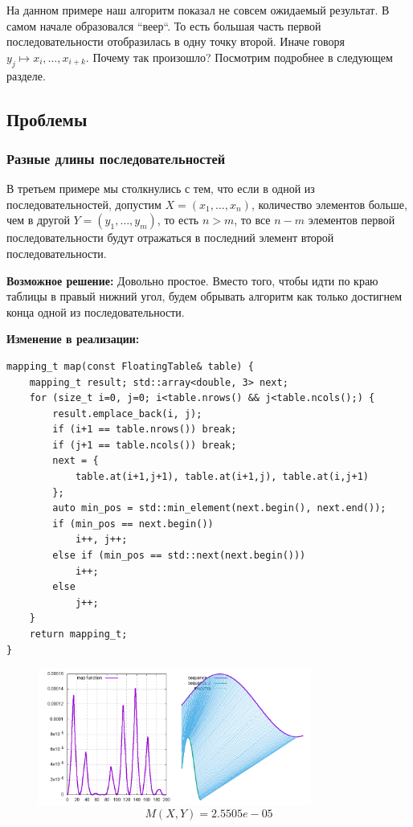 \documentclass[12pt]{article}
\begin{document}
\begin{enumerate}
    На данном примере наш алгоритм показал не совсем ожидаемый результат.
    В самом начале образовался ``веер``.
    То есть большая часть первой последовательности отобразилась в одну
    точку второй. Иначе говоря $y_j \mapsto {x_i,\ldots,x_{i+k}}$. Почему так произошло?
    Посмотрим подробнее в следующем разделе.

\end{enumerate}

\newpage
\subsection{Проблемы}

\subsubsection{Разные длины последовательностей}
     В третьем примере мы столкнулись с тем, что если в одной из последовательностей,
     допустим $X = (x_1, \ldots, x_n)$, количество элементов больше, чем в другой $Y = (y_1, \ldots,y_m)$,
     то есть $n > m$, то все $n - m$ элементов первой последовательности будут отражаться в последний
     элемент второй последовательности.

     \textbf{Возможное решение:} Довольно простое. Вместо того, чтобы идти по краю таблицы в правый
     нижний угол, будем обрывать алгоритм как только достигнем конца одной из последовательности.

    \textbf{Изменение в реализации:}
    \begin{lstlisting}
mapping_t map(const FloatingTable& table) {
    mapping_t result; std::array<double, 3> next;
    for (size_t i=0, j=0; i<table.nrows() && j<table.ncols();) {
        result.emplace_back(i, j);
        if (i+1 == table.nrows()) break;
        if (j+1 == table.ncols()) break;
        next = {
            table.at(i+1,j+1), table.at(i+1,j), table.at(i,j+1)
        };
        auto min_pos = std::min_element(next.begin(), next.end());
        if (min_pos == next.begin())
            i++, j++;
        else if (min_pos == std::next(next.begin()))
            i++;
        else
            j++;
    }
    return mapping_t;
}
    \end{lstlisting}


    \begin{figure}[h]
        \centering
        \includegraphics[scale=1.2, width=0.8\textwidth, height=0.4\textwidth]{sin2}
        $$M(X, Y) = 2.5505e-05$$
    \end{figure}
\end{document}
